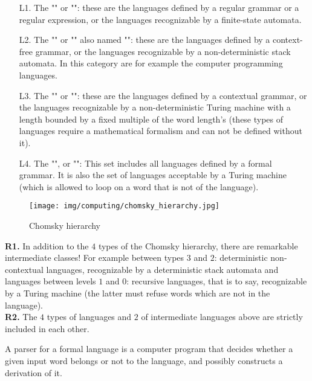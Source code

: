 	\begin{enumerate}
		\item[L1.] The "" or "": these are the languages defined by a regular grammar or a regular expression, or the languages recognizable by a finite-state automata.

		\item[L2.]  The "" or "" also named "": these are the languages defined by a context-free grammar, or the languages recognizable by a non-deterministic stack automata. In this category are for example the computer programming languages.

		\item[L3.]  The ""  or "": these are the languages defined by a contextual grammar, or the languages recognizable by a non-deterministic Turing machine with a length bounded by a fixed multiple of the word length's (these types of languages require a mathematical formalism and can not be defined without it).

		\item[L4.]  The "", or "": This set includes all languages defined by a formal grammar. It is also the set of languages acceptable by a Turing machine (which is allowed to loop on a word that is not of the language).
	\end{enumerate}	
	\begin{figure}[H]
		\centering
		\texttt{[image: img/computing/chomsky\_hierarchy.jpg]}
		\caption{Chomsky hierarchy}
	\end{figure}
	\begin{tcolorbox}[title=Remarks,colframe=black,arc=10pt]
	\textbf{R1.} In addition to the $4$ types of the Chomsky hierarchy, there are remarkable intermediate classes! For example between types $3$ and $2$: deterministic non-contextual languages, recognizable by a deterministic stack automata and languages between levels $1$ and $0$: recursive languages, that is to say, recognizable by a Turing machine (the latter must refuse words which are not in the language).\\
	
	\textbf{R2.} The $4$ types of languages and $2$ of intermediate languages above are strictly included in each other.
	\end{tcolorbox}
	A parser for a formal language is a computer program that decides whether a given input word belongs or not to the language, and possibly constructs a derivation of it.

